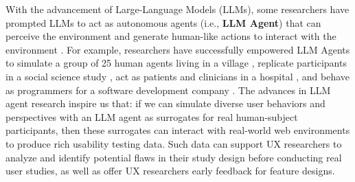 \documentclass[manuscript,review,anonymous]{acmart}
\begin{document}
With the advancement of Large-Language Models (LLMs), some researchers have prompted LLMs to act as autonomous agents (i.e., \textbf{LLM Agent}) that can perceive the environment and generate human-like actions to interact with the environment \cite{wangSurveyLargeLanguage2024}. 
For example, researchers have successfully empowered LLM Agents to simulate a group of 25 human agents living in a village \cite{parkGenerativeAgentsInteractive2023},
replicate participants in a social science study \cite{parkGenerativeAgentSimulations2024,schmidgallAgentClinicMultimodalAgent2024,leeApplicationsGPTPolitical,gurcanLLMAugmentedAgentBasedModelling2024}, act as patients and clinicians in a hospital \cite{liAgentHospitalSimulacrum2024}, and behave as programmers for a software development company \cite{qianChatDevCommunicativeAgents2024}.
The advances in LLM agent research inspire us that: if we can simulate diverse user behaviors and perspectives with an LLM agent as surrogates for real human-subject participants, then these surrogates can interact with real-world web environments to produce rich usability testing data.
Such data can support UX researchers to analyze and identify potential flaws in their study design before conducting real user studies, as well as offer UX researchers early feedback for feature designs. 
\end{document}
